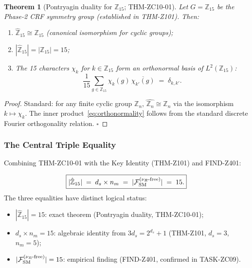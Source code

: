 \documentclass[12pt, a4paper]{article}
\newtheorem{theorem}{Theorem}[section]
\begin{document}
\begin{theorem}[Pontryagin duality for $\mathbb{Z}_{15}$; THM-ZC10-01]
\label{thm:pontryagin}
Let $G = \mathbb{Z}_{15}$ be the Phase-2 CRF symmetry group
(established in THM-Z101). Then:
\begin{enumerate}[leftmargin=*, label=(\roman*)]
  \item $\hat{\mathbb{Z}}_{15} \cong \mathbb{Z}_{15}$ \quad
    (canonical isomorphism for cyclic groups);
  \item $|\hat{\mathbb{Z}}_{15}| = |\mathbb{Z}_{15}| = 15$;
  \item The 15 characters $\chi_k$ for $k \in \mathbb{Z}_{15}$
    form an orthonormal basis of $L^2(\mathbb{Z}_{15})$:
    \begin{equation}
      \frac{1}{15}\sum_{g \in \mathbb{Z}_{15}}
      \chi_k(g)\,\overline{\chi_{k'}(g)}
      \;=\; \delta_{k,k'}.
      \label{eq:orthonormality}
    \end{equation}
\end{enumerate}
\end{theorem}

\begin{proof}
Standard: for any finite cyclic group $\mathbb{Z}_n$,
$\widehat{\mathbb{Z}_n} \cong \mathbb{Z}_n$ via the isomorphism
$k \mapsto \chi_k$.
The inner product~\eqref{eq:orthonormality} follows from the
standard discrete Fourier orthogonality relation. \hfill$\square$
\end{proof}

\subsubsection{The Central Triple Equality}

Combining THM-ZC10-01 with the Key Identity (THM-Z101) and
FIND-Z401:

\begin{keybox}[title={Central Result: The Triple Equality (EQ-ZC10-01)}]
\begin{equation}
  \boxed{|\hat{\mathbb{Z}}_{15}|
  \;=\; d_s \times n_m
  \;=\; |\mathcal{F}_{\rm SM}^{(\nu_R\text{-free})}|
  \;=\; 15.}
  \label{eq:triple}
\end{equation}
The three equalities have distinct logical status:
\begin{itemize}[leftmargin=*]
  \item $|\hat{\mathbb{Z}}_{15}| = 15$: exact theorem
    (Pontryagin duality, THM-ZC10-01);
  \item $d_s \times n_m = 15$: algebraic identity from
    $3d_s = 2^{d_s}+1$ (THM-Z101, $d_s=3$, $n_m=5$);
  \item $|\mathcal{F}_{\rm SM}^{(\nu_R\text{-free})}| = 15$:
    empirical finding (FIND-Z401, confirmed in TASK-ZC09).
\end{itemize}
\end{keybox}
\end{document}
